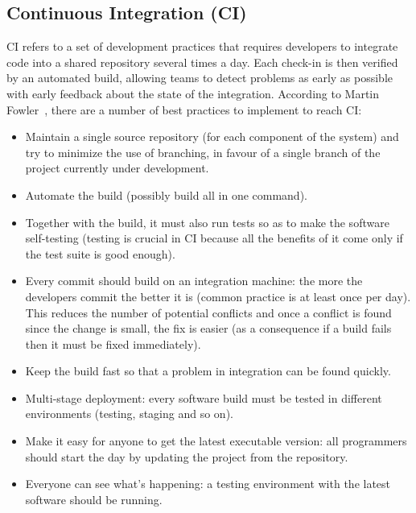 \documentclass[a4paper]{spie}  %
\begin{document}
\subsection{Continuous Integration (CI)}
CI refers to a set of development practices that requires developers to integrate code into a shared repository several times a day. Each check-in is then verified by an automated build, allowing teams to detect problems as early as possible with early feedback about the state of the integration.
According to Martin Fowler~\cite{CI}, there are a number of best practices to implement to reach CI:
\begin{itemize}
    \item Maintain a single source repository (for each component of the system) and try to minimize the use of branching, in favour of a single branch of the project currently under development.
    \item Automate the build (possibly build all in one command).
    \item Together with the build, it must also run tests so as to make the software self-testing (testing is crucial in CI because all the benefits of it come only if the test suite is good enough).
    \item Every commit should build on an integration machine: the more the developers commit the better it is (common practice is at least once per day). This reduces the number of potential conflicts and once a conflict is found since the change is small, the fix is easier (as a consequence if a build fails then it must be fixed immediately).
    \item Keep the build fast so that a problem in integration can be found quickly.
    \item Multi-stage deployment: every software build must be tested in different environments (testing, staging and so on).
    \item Make it easy for anyone to get the latest executable version: all programmers should start the day by updating the project from the repository.
    \item Everyone can see what’s happening: a testing environment with the latest software should be running.
\end{itemize}
\end{document}
